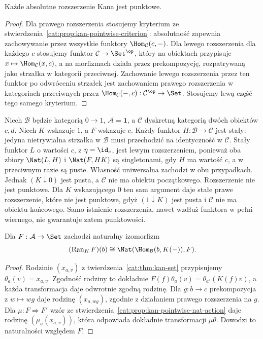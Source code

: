 \begin{wniosek}\label{cat:cor:kan-absolute-pointwise}
Każde absolutne rozszerzenie Kana jest punktowe.
\end{wniosek}
\begin{proof}
Dla prawego rozszerzenia stosujemy kryterium ze stwierdzenia~\ref{cat:prop:kan-pointwise-criterion}: absolutność zapewnia zachowywanie przez wszystkie funktory $\Hom_{\mathcal C}(c,-)$. Dla lewego rozszerzenia dla każdego $c$ stosujemy funktor $\mathcal C\to\Set^{\op}$, który na obiektach przypisuje $x\mapsto\Hom_{\mathcal C}(x,c)$, a na morfizmach działa przez prekompozycję, rozpatrywaną jako strzałka w kategorii przeciwnej. Zachowanie lewego rozszerzenia przez ten funktor po odwróceniu strzałek jest zachowaniem prawego rozszerzenia w kategoriach przeciwnych przez $\Hom_{\mathcal C}(-,c):\mathcal C^{\op}\to\Set$. Stosujemy lewą część tego samego kryterium.
\end{proof}
\begin{przyklad}\label{cat:ex:kan-nonpointwise}
Niech $\mathcal B$ będzie kategorią $0\to1$, $\mathcal A=\mathbf1$, a $\mathcal C$ dyskretną kategorią dwóch obiektów $c,d$. Niech $K$ wskazuje $1$, a $F$ wskazuje $c$. Każdy funktor $H:\mathcal B\to\mathcal C$ jest stały: jedyna nietrywialna strzałka w $\mathcal B$ musi przechodzić na identyczność w $\mathcal C$. Stały funktor $L$ o wartości $c$, z $\eta=\id_c$, jest lewym rozszerzeniem, ponieważ oba zbiory $\Nat(L,H)$ i $\Nat(F,HK)$ są singletonami, gdy $H$ ma wartość $c$, a w przeciwnym razie są puste. Własność uniwersalna zachodzi w obu przypadkach. Jednak $(K\downarrow0)$ jest pusta, a $\mathcal C$ nie ma obiektu początkowego. Rozszerzenie nie jest punktowe. Dla $K$ wskazującego $0$ ten sam argument daje stałe prawe rozszerzenie, które nie jest punktowe, gdyż $(1\downarrow K)$ jest pusta i $\mathcal C$ nie ma obiektu końcowego. Samo istnienie rozszerzenia, nawet wzdłuż funktora w pełni wiernego, nie gwarantuje zatem punktowości.
\end{przyklad}
\begin{stwierdzenie}\label{cat:prop:kan-ran-nat}
Dla $F:\mathcal A\to\Set$ zachodzi naturalny izomorfizm
\[
 (\operatorname{Ran}_K F)(b)
 \cong\Nat(\Hom_{\mathcal B}(b,K(-)),F).
\]
\end{stwierdzenie}
\begin{proof}
Rodzinie $(x_{a,v})$ z twierdzenia~\ref{cat:thm:kan-set} przypisujemy $\theta_a(v)=x_{a,v}$. Zgodność rodziny to dokładnie $F(f)\theta_a(v)=\theta_{a'}(K(f)v)$, a każda transformacja daje odwrotnie zgodną rodzinę. Dla $g:b\to c$ prekompozycja z $w\mapsto wg$ daje rodzinę $(x_{a,wg})$, zgodnie z działaniem prawego rozszerzenia na $g$. Dla $\mu:F\Rightarrow F'$ wzór ze stwierdzenia~\ref{cat:prop:kan-pointwise-nat-action} daje rodzinę $(\mu_a(x_{a,v}))$, która odpowiada dokładnie transformacji $\mu\theta$. Dowodzi to naturalności względem $F$.
\end{proof}
